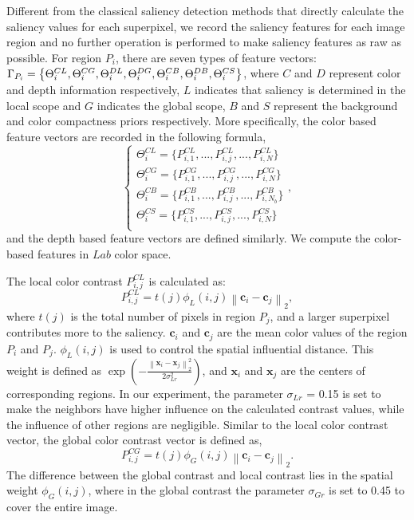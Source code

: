\documentclass[journal]{IEEEtran}
\begin{document}
Different from the classical saliency detection methods that directly calculate the saliency values for each superpixel, we record the saliency features for each image region and no further operation is performed to make saliency features as raw as possible. For region $P_i$, there are seven types of feature vectors: ${\Gamma _{{P_i}}}  = \left\{ {{\Theta_i ^{CL}},{\Theta_i ^{CG}},{\Theta_i ^{DL}},{\Theta_i ^{DG}},{\Theta_i ^{CB}},\\{\Theta_i ^{DB}},{\Theta_i ^{CS}}} \right\}$, where $C$ and $D$ represent color and depth information respectively, $L$ indicates that saliency is determined in the local scope and $G$ indicates the global scope, $B$ and $S$ represent the background and color compactness priors respectively. More specifically, the color based feature vectors are recorded in the following formula,
\begin{equation}\label{Color_LG}
  \left\{ \begin{array}{l}
{\Theta_i ^{CL}} = \{ P_{i,1}^{CL},...,P_{i,j}^{CL},...,P_{i,N}^{CL}\} \\
{\Theta_i ^{CG}} = \{ P_{i,1}^{CG},...,P_{i,j}^{CG},...,P_{i,N}^{CG}\} \\
{\Theta_i ^{CB}} = \{ P_{i,1}^{CB},...,P_{i,j}^{CB},...,P_{i,N_b}^{CB}\} \\
{\Theta_i ^{CS}} = \{ P_{i,1}^{CS},...,P_{i,j}^{CS},...,P_{i,N}^{CS}\} \\
\end{array} \right.,
\end{equation}
and the depth based feature vectors are defined similarly. We compute the color-based features in $Lab$ color space.

The local color contrast $P_{i,j}^{CL}$ is calculated as:
\begin{equation}\label{color_contrast local}
  P_{i,j}^{CL} = t({{{j}}})\phi_L ({i},{j})\left\| {{\bm{c}_{{i}}} - {\bm{c}_{{j}}}} \right\|_2,
\end{equation}
where $t({j})$ is the total number of pixels in region $P_j$, and a larger superpixel contributes more to the saliency. ${\bm{c}_{i}}$ and ${\bm{c}_{j}}$ are the mean color values of the region $P_i$ and $P_j$. $\phi_L ({i},{j})$ is used to control the spatial influential distance. This weight is defined as $\exp ( - \frac{{{{\left\| {{{\bm{x}_i}} - {{\bm{x}_j}}} \right\|_2^2}}}}{{2\sigma _{Lr}^2}})$, and $\bm{x}_i$ and $\bm{x}_j$ are the centers of corresponding regions. In our experiment, the parameter $\sigma _{Lr}$ = 0.15 is set to make the neighbors have higher influence on the calculated contrast values, while the influence of other regions are negligible. Similar to the local color contrast vector, the global color contrast vector is defined as,
\begin{equation}\label{color_contrast_global}
 P_{i,j}^{CG} = t({{j}}){\phi _G}({i},{j})\left\| {{\bm{c}_{{i}}} - {\bm{c}_{{j}}}} \right\|_2.
\end{equation}
The difference between the global contrast and local contrast lies in the spatial weight $\phi_G ({i},{j})$, where in the global contrast the parameter $\sigma _{Gr}$ is set to 0.45 to cover the entire image.
\end{document}
